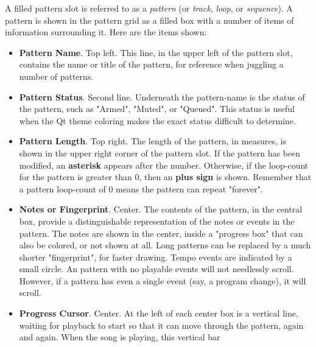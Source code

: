    A filled pattern slot is referred to as a \textsl{pattern}
   (or \textsl{track}, \textsl{loop}, or \textsl{sequence}).
   A pattern is shown in the pattern grid as a filled box with a number of
   items of information surrounding it.  Here are the items shown:

   \begin{itemize}
      \item \textbf{Pattern Name}. Top left.
         This line, in the upper left of the pattern slot, contains the name or
         title of the pattern, for reference when juggling a number of
         patterns.
      \item \textbf{Pattern Status}. Second line.
         Underneath the pattern-name is the status of the pattern, such as
         "Armed", "Muted", or "Queued".
         This status is useful when the Qt theme coloring makes the exact
         status difficult to determine.
      \item \textbf{Pattern Length}. Top right.
         The length of the pattern, in measures, is shown in the upper
         right corner of the pattern slot.
         If the pattern has been modified, an \textbf{asterisk}
         appears after the
         number.
         Otherwise, if the loop-count for the pattern is greater than 0, 
         then an \textbf{plus sign} is shown.
         Remember that a pattern loop-count of 0 means the pattern can repeat
         "forever".
      \item \textbf{Notes or Fingerprint}. Center.
         The contents of the pattern, in the central box,
         provide a distinguishable representation of the notes or events in the
         pattern.
         The notes are shown in the center, inside a "progress box" that
         can also be colored, or not shown at all.
         Long patterns can be replaced by a much shorter "fingerprint", for
         faster drawing.
         Tempo events are indicated by a small circle.
         An pattern with no playable events will not needlessly scroll.
         However, if a pattern has even a single event (say, a program change),
         it will scroll.
      \item \textbf{Progress Cursor}. Center.
         At the left of each center box is a vertical line, waiting for
         playback to start so that it can move through the pattern, again and
         again.
         When the song is playing, this vertical bar

\end{itemize}
